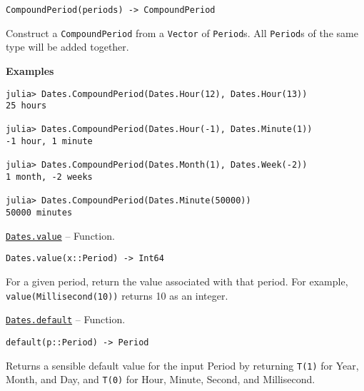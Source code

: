 \begin{adjustwidth}{2em}{0pt}


\begin{verbatim}
CompoundPeriod(periods) -> CompoundPeriod
\end{verbatim}

Construct a \texttt{CompoundPeriod} from a \texttt{Vector} of \texttt{Period}s. All \texttt{Period}s of the same type will be added together.

\textbf{Examples}


\begin{verbatim}
julia> Dates.CompoundPeriod(Dates.Hour(12), Dates.Hour(13))
25 hours

julia> Dates.CompoundPeriod(Dates.Hour(-1), Dates.Minute(1))
-1 hour, 1 minute

julia> Dates.CompoundPeriod(Dates.Month(1), Dates.Week(-2))
1 month, -2 weeks

julia> Dates.CompoundPeriod(Dates.Minute(50000))
50000 minutes
\end{verbatim}



\end{adjustwidth}
\hypertarget{6471383377711200525}{} 
\hyperlink{6471383377711200525}{\texttt{Dates.value}}  -- {Function.}

\begin{adjustwidth}{2em}{0pt}


\begin{verbatim}
Dates.value(x::Period) -> Int64
\end{verbatim}

For a given period, return the value associated with that period.  For example, \texttt{value(Millisecond(10))} returns 10 as an integer.



\end{adjustwidth}
\hypertarget{9890661094020401012}{} 
\hyperlink{9890661094020401012}{\texttt{Dates.default}}  -- {Function.}

\begin{adjustwidth}{2em}{0pt}


\begin{verbatim}
default(p::Period) -> Period
\end{verbatim}

Returns a sensible {\textquotedbl}default{\textquotedbl} value for the input Period by returning \texttt{T(1)} for Year, Month, and Day, and \texttt{T(0)} for Hour, Minute, Second, and Millisecond.



\end{adjustwidth}

